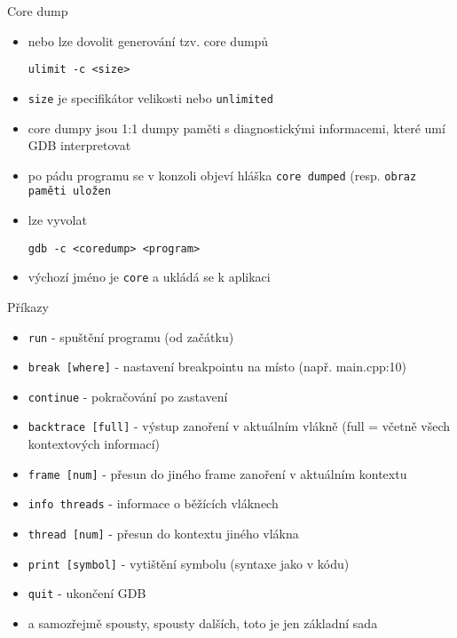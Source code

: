 \documentclass{beamer}
\begin{document}
\begin{xframe}{Core dump}
	\begin{itemize}
		\item nebo lze dovolit generování tzv. core dumpů
\begin{lstlisting}[basicstyle=\fontsize{8}{9}\selectfont\ttfamily]
ulimit -c <size>
\end{lstlisting}
		\item \texttt{size} je specifikátor velikosti nebo \texttt{unlimited}
		\item core dumpy jsou 1:1 dumpy paměti s diagnostickými informacemi, které umí GDB interpretovat
		\item po pádu programu se v konzoli objeví hláška \texttt{core dumped} (resp. \texttt{obraz paměti uložen}
		\item lze vyvolat
\begin{lstlisting}[basicstyle=\fontsize{8}{9}\selectfont\ttfamily]
gdb -c <coredump> <program>
\end{lstlisting}
		\item výchozí jméno je \texttt{core} a ukládá se k aplikaci
	\end{itemize}
\end{xframe}

\begin{xframe}{Příkazy}
	\begin{itemize}
		\item \texttt{run} - spuštění programu (od začátku)
		\item \texttt{break [where]} - nastavení breakpointu na místo (např. main.cpp:10)
		\item \texttt{continue} - pokračování po zastavení
		\item \texttt{backtrace [full]} - výstup zanoření v aktuálním vlákně (full = včetně všech kontextových informací)
		\item \texttt{frame [num]} - přesun do jiného frame zanoření v aktuálním kontextu
		\item \texttt{info threads} - informace o běžících vláknech
		\item \texttt{thread [num]} - přesun do kontextu jiného vlákna
		\item \texttt{print [symbol]} - vytištění symbolu (syntaxe jako v kódu)
		\item \texttt{quit} - ukončení GDB
		\item a samozřejmě spousty, spousty dalších, toto je jen základní sada
	\end{itemize}
\end{xframe}
\end{document}
